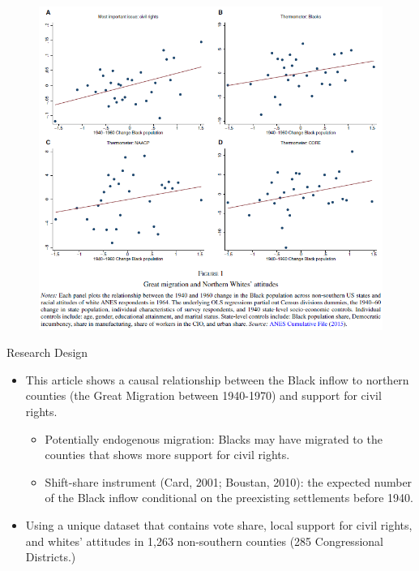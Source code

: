 \documentclass[dvipdfmx,11pt]{beamer}
\begin{document}
\begin{frame}{}
  \begin{figure}
    \centering
    \includegraphics[scale = .45]{fig_tab/os20220708/F1.png}
  \end{figure}
\end{frame}

\begin{frame}{Research Design}
  \begin{itemize}
    \item This article shows a causal relationship between the Black inflow to northern counties (the Great Migration between 1940-1970) and support for civil rights.
    \begin{itemize}
      \item Potentially endogenous migration: Blacks may have migrated to the counties that shows more support for civil rights.
      \item Shift-share instrument (Card, 2001; Boustan, 2010): the expected number of the Black inflow conditional on the preexisting settlements before 1940.
    \end{itemize}
    \item Using a unique dataset that contains vote share, local support for civil rights, and whites' attitudes in 1,263 non-southern counties (285 Congressional Districts.)
  \end{itemize}
\end{frame}
\end{document}
